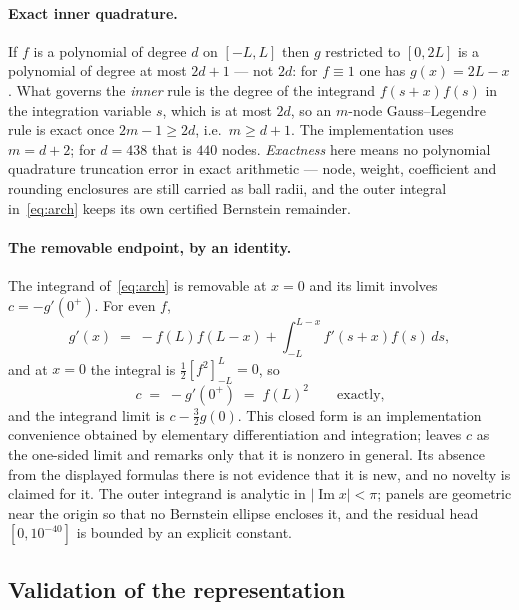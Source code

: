 \documentclass[11pt,a4paper]{article}
\theoremstyle{definition}
\theoremstyle{remark}
\begin{document}
\paragraph{Exact inner quadrature.} If $f$ is a polynomial of degree $d$ on
$[-L,L]$ then $g$ restricted to $[0,2L]$ is a polynomial of degree at most
$2d+1$ --- not $2d$: for $f \equiv 1$ one has $g(x) = 2L - x$. What governs the
\emph{inner} rule is the degree of the integrand $f(s+x)f(s)$ in the
integration variable $s$, which is at most $2d$, so an $m$-node
Gauss--Legendre rule is exact once $2m - 1 \ge 2d$, i.e.\ $m \ge d+1$. The implementation uses $m = d+2$; for $d = 438$ that is $440$
nodes. \emph{Exactness} here means no polynomial quadrature truncation error in
exact arithmetic --- node, weight, coefficient and rounding enclosures are still
carried as ball radii, and the outer integral in~\eqref{eq:arch} keeps its own
certified Bernstein remainder.

\paragraph{The removable endpoint, by an identity.} The integrand
of~\eqref{eq:arch} is removable at $x = 0$ and its limit involves
$c = -g'(0^{+})$. For even $f$,
\[
   g'(x) \;=\; -f(L) f(L-x) + \int_{-L}^{L-x} f'(s+x) f(s)\, ds ,
\]
and at $x = 0$ the integral is $\tfrac12[f^2]_{-L}^{L} = 0$, so
\begin{equation}
\label{eq:c}
   c \;=\; -g'(0^{+}) \;=\; f(L)^2 \qquad\text{exactly,}
\end{equation}
and the integrand limit is $c - \tfrac32 g(0)$. This closed form is an
implementation convenience obtained by elementary differentiation and
integration; \cite[Lemma 2.5]{Zhu} leaves $c$ as the one-sided limit and remarks
only that it is nonzero in general. Its absence from the displayed formulas
there is not evidence that it is new, and no novelty is claimed for it. The outer integrand is analytic
in $|\operatorname{Im} x| < \pi$; panels are geometric near the origin so that no
Bernstein ellipse encloses it, and the residual head $[0,10^{-40}]$ is bounded
by an explicit constant.

\subsection{Validation of the representation}
\end{document}
